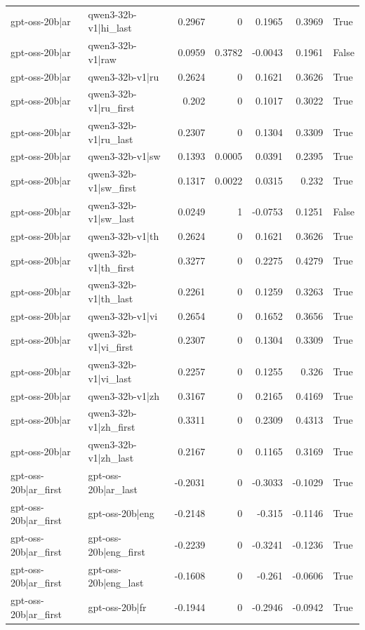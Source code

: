 \begin{table}
\begin{tabular}{l l r r r r l}
gpt-oss-20b|ar & qwen3-32b-v1|hi_last & 0.2967 & 0 & 0.1965 & 0.3969 & True \\
gpt-oss-20b|ar & qwen3-32b-v1|raw & 0.0959 & 0.3782 & -0.0043 & 0.1961 & False \\
gpt-oss-20b|ar & qwen3-32b-v1|ru & 0.2624 & 0 & 0.1621 & 0.3626 & True \\
gpt-oss-20b|ar & qwen3-32b-v1|ru_first & 0.202 & 0 & 0.1017 & 0.3022 & True \\
gpt-oss-20b|ar & qwen3-32b-v1|ru_last & 0.2307 & 0 & 0.1304 & 0.3309 & True \\
gpt-oss-20b|ar & qwen3-32b-v1|sw & 0.1393 & 0.0005 & 0.0391 & 0.2395 & True \\
gpt-oss-20b|ar & qwen3-32b-v1|sw_first & 0.1317 & 0.0022 & 0.0315 & 0.232 & True \\
gpt-oss-20b|ar & qwen3-32b-v1|sw_last & 0.0249 & 1 & -0.0753 & 0.1251 & False \\
gpt-oss-20b|ar & qwen3-32b-v1|th & 0.2624 & 0 & 0.1621 & 0.3626 & True \\
gpt-oss-20b|ar & qwen3-32b-v1|th_first & 0.3277 & 0 & 0.2275 & 0.4279 & True \\
gpt-oss-20b|ar & qwen3-32b-v1|th_last & 0.2261 & 0 & 0.1259 & 0.3263 & True \\
gpt-oss-20b|ar & qwen3-32b-v1|vi & 0.2654 & 0 & 0.1652 & 0.3656 & True \\
gpt-oss-20b|ar & qwen3-32b-v1|vi_first & 0.2307 & 0 & 0.1304 & 0.3309 & True \\
gpt-oss-20b|ar & qwen3-32b-v1|vi_last & 0.2257 & 0 & 0.1255 & 0.326 & True \\
gpt-oss-20b|ar & qwen3-32b-v1|zh & 0.3167 & 0 & 0.2165 & 0.4169 & True \\
gpt-oss-20b|ar & qwen3-32b-v1|zh_first & 0.3311 & 0 & 0.2309 & 0.4313 & True \\
gpt-oss-20b|ar & qwen3-32b-v1|zh_last & 0.2167 & 0 & 0.1165 & 0.3169 & True \\
gpt-oss-20b|ar_first & gpt-oss-20b|ar_last & -0.2031 & 0 & -0.3033 & -0.1029 & True \\
gpt-oss-20b|ar_first & gpt-oss-20b|eng & -0.2148 & 0 & -0.315 & -0.1146 & True \\
gpt-oss-20b|ar_first & gpt-oss-20b|eng_first & -0.2239 & 0 & -0.3241 & -0.1236 & True \\
gpt-oss-20b|ar_first & gpt-oss-20b|eng_last & -0.1608 & 0 & -0.261 & -0.0606 & True \\
gpt-oss-20b|ar_first & gpt-oss-20b|fr & -0.1944 & 0 & -0.2946 & -0.0942 & True \\

\end{tabular}
\end{table}
